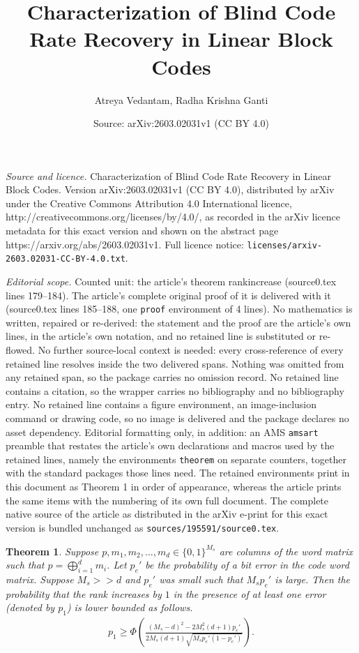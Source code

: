 \documentclass[10pt,a4paper]{amsart}
\title{Characterization of Blind Code Rate Recovery in Linear Block Codes}
\author{Atreya Vedantam, Radha Krishna Ganti}
\date{Source: arXiv:2603.02031v1 (CC BY 4.0)}
\newtheorem{theorem}{Theorem}
\begin{document}
\maketitle

\noindent\emph{Source and licence.} Characterization of Blind Code Rate Recovery in Linear Block Codes. Version arXiv:2603.02031v1 (CC BY 4.0), distributed by arXiv under the Creative Commons Attribution 4.0 International licence, http://creativecommons.org/licenses/by/4.0/, as recorded in the arXiv licence metadata for this exact version and shown on the abstract page https://arxiv.org/abs/2603.02031v1. Full licence notice: \texttt{licenses/arxiv-2603.02031-CC-BY-4.0.txt}.\par\smallskip

\noindent\textit{Editorial scope.} Counted unit: the article's theorem rankincrease (source0.tex lines 179--184). The article's complete original proof of it is delivered with it (source0.tex lines 185--188, one \texttt{proof} environment of 4 lines). No mathematics is written, repaired or re-derived: the statement and the proof are the article's own lines, in the article's own notation, and no retained line is substituted or re-flowed.  No further source-local context is needed: every cross-reference of every retained line resolves inside the two delivered spans.  Nothing was omitted from any retained span, so the package carries no omission record.  No retained line contains a citation, so the wrapper carries no bibliography and no bibliography entry.  No retained line contains a figure environment, an image-inclusion command or drawing code, so no image is delivered and the package declares no asset dependency.  Editorial formatting only, in addition: an AMS \texttt{amsart} preamble that restates the article's own declarations and macros used by the retained lines, namely the environments \texttt{theorem} on separate counters, together with the standard packages those lines need.  The retained environments print in this document as Theorem 1 in order of appearance, whereas the article prints the same items with the numbering of its own full document.  The complete native source of the article as distributed in the arXiv e-print for this exact version is bundled unchanged as \texttt{sources/195591/source0.tex}.
\begin{theorem}
    Suppose $p, m_1, m_2, \ldots, m_d \in \{0, 1\}^{M_s}$ are columns of the word matrix such that $p = \bigoplus_{i=1}^d m_i$. Let $p_e'$ be the probability of a bit error in the code word matrix. Suppose $M_s >> d$ and $p_e'$ was small such that $M_sp_e'$ is large. Then the probability that the rank increases by $1$ in the presence of at least one error (denoted by $p_1$) is lower bounded as follows.
    \begin{align}\label{rankincrease}
        p_1 \geq \Phi \left(\frac{(M_s-d)^2 - 2M_s^2(d+1)p_e'}{2M_s(d+1)\sqrt{M_sp_e'(1-p_e')}}\right).
    \end{align}
\end{theorem}
\end{document}
